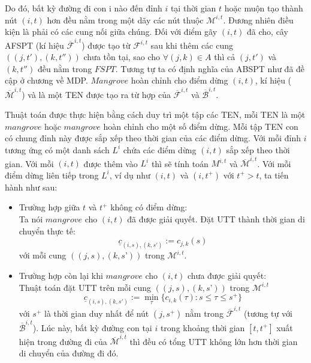 \documentclass[../main.tex]{subfiles}
\begin{document}
Do đó, bất kỳ đường đi con i nào đến đỉnh \(i\) tại thời gian \(t\) hoặc
muộn tạo thành nút \((i,t)\) hơn đều nằm trong một dãy các nút thuộc
\(\mathcal M^{i, t}\). Đương nhiên điều kiện là phải có các cung nối giữa
chúng. Đối với điểm gãy \((i, t)\) đã cho, cây AFSPT (kí hiệu
\(\mathcal{\overline{F}}^{i,t}\)) được tạo từ \(\mathcal F^{i,t}\) sau khi thêm
các cung \(((j, t'), (k, t''))\) chưa tồn tại, sao cho
\(\forall (j, k) \in A\) thì cả \((j,t')\) và \((k,t'')\) đều nằm trong
\(FSPT.\) Tương tự ta có định nghĩa của ABSPT như đã đề cập ở chương về
MDP. \(Mangrove\) hoàn chỉnh cho điểm dừng \((i, t)\), kí hiệu
(\(\overline{\mathcal M}^{i,t}\)) và là một TEN được tạo ra từ hợp của
\(\mathcal{\overline{F}}^{i,t}\) và \(\mathcal{\overline{B}}^{i,t}\).

Thuật toán được thực hiện bằng cách duy trì một tập các TEN, mỗi TEN là
một \(mangrove\) hoặc \(mangrove\) hoàn chỉnh cho một số điểm dừng. Mỗi
tập TEN con có chung đỉnh này được sắp xếp theo thời gian của các điểm
dừng. Với mỗi đỉnh \(i\) tương ứng có một danh sách \(L^i\) chứa các
điểm dừng \((i, t)\) sắp xếp theo thời gian. Với mỗi \((i, t)\) được
thêm vào \(L^i\) thì sẽ tính toán \(M^{i, t}\) và
\(\overline{\mathcal M}^{i,t}\). Với mỗi điểm dừng liên tiếp trong \(L^i\),
ví dụ như \((i,t)\) và \((i,t^+)\) với \(t^+ > t\), ta tiến hành như
sau:

\begin{itemize}
\tightlist
\item
  Trường hợp giữa \(t\) và \(t^+\) không có điểm dừng: \\
  Ta nói
  \(mangrove\) cho \((i, t)\) đã được giải quyết. Đặt UTT thành thời
  gian di chuyển thực tế:
  \[\underline c_{(i, s), (k, s')}:=c_{j, k}(s)\] với mỗi cung
  \(((j,s),(k,s’))\) trong \(\mathcal M^{i,t}\).
\item
  Trường hợp còn lại khi \(mangrove\) cho \((i, t)\) chưa được giải
  quyết: \\
  Thuật toán đặt UTT trên mỗi cung \(((j, s), (k, s’))\) trong
  \(\mathcal M^{i,t}\)
  \[\underline c_{(i, s), (k, s')}:=\min_\tau\{c_{i, k}(\tau):s\le \tau \le s^+\}\]
  với \(s^+\) là thời gian duy nhất để nút \((j, s^+)\) nằm trong
  \(\mathcal{\overline{F}}^{i,t}\) (tương tự với \(\mathcal{\overline{B}}^{i,t}\)).
  Lúc này, bất kỳ đường con tại \(i\) trong khoảng thời gian \([t,t^+]\)
  xuất hiện trong đường đi của \(\overline{\mathcal M}^{i,t}\) thì đều có
  tổng UTT không lớn hơn thời gian di chuyển của đường đi đó.
\end{itemize}
\end{document}
